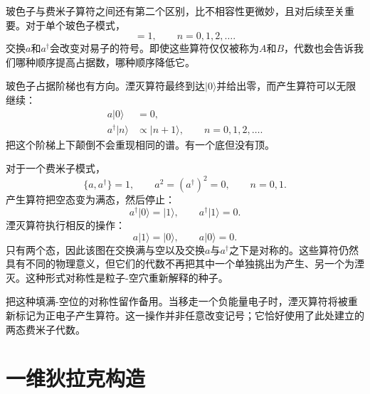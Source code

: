玻色子与费米子算符之间还有第二个区别，比不相容性更微妙，且对后续至关重要。对于单个玻色子模式，
\begin{equation}
[a,a^\dagger]=1,
\qquad
n=0,1,2,\ldots.
\end{equation}
交换\(a\)和\(a^\dagger\)会改变对易子的符号。即使这些算符仅仅被称为\(A\)和\(B\)，代数也会告诉我们哪种顺序提高占据数，哪种顺序降低它。

玻色子占据阶梯也有方向。湮灭算符最终到达\(\lvert0\rangle\)并给出零，而产生算符可以无限继续：
\begin{align}
a\lvert0\rangle&=0,\\
a^\dagger\lvert n\rangle&\propto\lvert n+1\rangle,
\qquad n=0,1,2,\ldots.
\end{align}
把这个阶梯上下颠倒不会重现相同的谱。有一个底但没有顶。

对于一个费米子模式，
\begin{equation}
\{a,a^\dagger\}=1,
\qquad
a^2=(a^\dagger)^2=0,
\qquad
n=0,1.
\label{eq:l10-fermion-mode}
\end{equation}
产生算符把空态变为满态，然后停止：
\begin{equation}
a^\dagger\lvert0\rangle=\lvert1\rangle,
\qquad
a^\dagger\lvert1\rangle=0.
\end{equation}
湮灭算符执行相反的操作：
\begin{equation}
a\lvert1\rangle=\lvert0\rangle,
\qquad
a\lvert0\rangle=0.
\end{equation}
只有两个态，因此该图在交换满与空以及交换\(a\)与\(a^\dagger\)之下是对称的。这些算符仍然具有不同的物理意义，但它们的代数不再把其中一个单独挑出为产生、另一个为湮灭。这种形式对称性是粒子-空穴重新解释的种子。

\begin{classroomqa}
\end{classroomqa}

把这种填满-空位的对称性留作备用。当移走一个负能量电子时，湮灭算符将被重新标记为正电子产生算符。这一操作并非任意改变记号；它恰好使用了此处建立的两态费米子代数。

\section{一维狄拉克构造}

